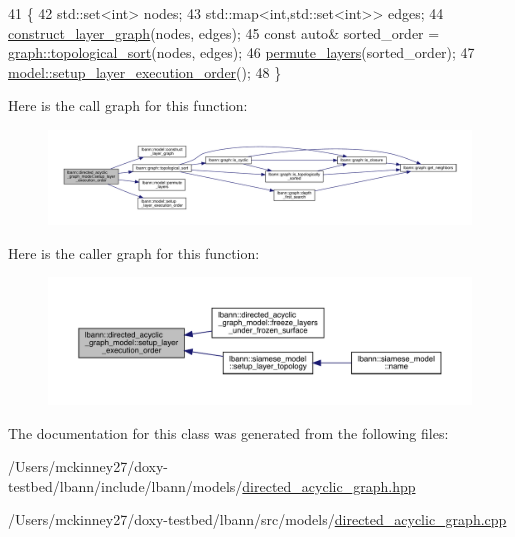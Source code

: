 \begin{DoxyCode}
41                                                                \{
42   std::set<int> nodes;
43   std::map<int,std::set<int>> edges;
44   \hyperlink{classlbann_1_1model_aef7a4775c70f96610bfc5a4605b946a5}{construct\_layer\_graph}(nodes, edges);
45   \textcolor{keyword}{const} \textcolor{keyword}{auto}& sorted\_order = \hyperlink{namespacelbann_1_1graph_aeb19a22d8fac402df104ed8d547a10ee}{graph::topological\_sort}(nodes, edges);
46   \hyperlink{classlbann_1_1model_a31c281b63593a0ec7110664f7309b01a}{permute\_layers}(sorted\_order);
47   \hyperlink{classlbann_1_1model_ab0e8af146d4121c1b8b04b4a3c2a455c}{model::setup\_layer\_execution\_order}();
48 \}
\end{DoxyCode}
Here is the call graph for this function\+:\nopagebreak
\begin{figure}[H]
\begin{center}
\leavevmode
\includegraphics[width=350pt]{classlbann_1_1directed__acyclic__graph__model_a2a70d5719832c481db9fa962f6e5f2bd_cgraph}
\end{center}
\end{figure}
Here is the caller graph for this function\+:\nopagebreak
\begin{figure}[H]
\begin{center}
\leavevmode
\includegraphics[width=350pt]{classlbann_1_1directed__acyclic__graph__model_a2a70d5719832c481db9fa962f6e5f2bd_icgraph}
\end{center}
\end{figure}


The documentation for this class was generated from the following files\+:\begin{DoxyCompactItemize}
\item 
/\+Users/mckinney27/doxy-\/testbed/lbann/include/lbann/models/\hyperlink{directed__acyclic__graph_8hpp}{directed\+\_\+acyclic\+\_\+graph.\+hpp}\item 
/\+Users/mckinney27/doxy-\/testbed/lbann/src/models/\hyperlink{directed__acyclic__graph_8cpp}{directed\+\_\+acyclic\+\_\+graph.\+cpp}\end{DoxyCompactItemize}

